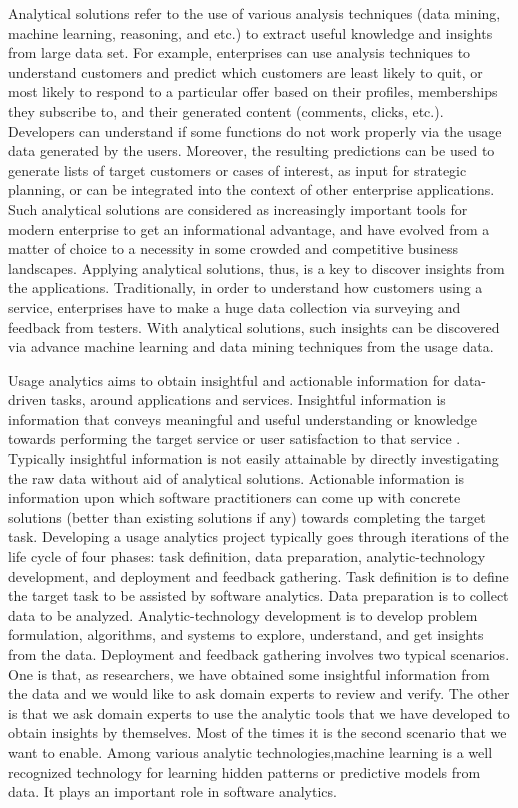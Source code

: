 Analytical solutions refer to the use of various analysis techniques (data mining, machine learning, reasoning, and etc.) to extract useful knowledge and insights from large data set. For example, enterprises can use analysis techniques to understand customers and predict which customers are least likely to quit, or most likely to respond to a particular offer based on their profiles, memberships they subscribe to, and their generated content (comments, clicks, etc.). Developers can understand if some functions do not work properly via the usage data generated by the users. Moreover, the resulting predictions can be used to generate lists of target customers or cases of interest, as input for strategic planning, or can be integrated into the context of other enterprise applications. Such analytical solutions are considered as increasingly important tools for modern enterprise to get an informational advantage, and have evolved from a matter of choice to a necessity in some crowded and competitive business landscapes. Applying analytical solutions, thus, is a key to discover insights from the applications. Traditionally, in order to understand how customers using a service, enterprises have to make a huge data collection via surveying and feedback from testers. With analytical solutions, such insights can be discovered via advance machine learning and data mining techniques from the usage data. 

Usage analytics aims to obtain insightful and actionable information for data-driven tasks, around applications and services. Insightful information is information that conveys meaningful and useful understanding or knowledge towards performing the target service or user satisfaction to that service \cite{Zhang2011}. Typically insightful information is not easily attainable by directly investigating the raw data without aid of analytical solutions. Actionable information is information upon which software practitioners can come up with concrete solutions (better than existing solutions if any) towards completing the target task. Developing a usage analytics project typically goes through iterations of the life cycle of four phases: task definition, data preparation, analytic-technology development, and deployment and feedback gathering. Task definition is to define the target task to be assisted by software analytics. Data preparation is to collect data to be analyzed. Analytic-technology development is to develop problem formulation, algorithms, and systems to explore, understand, and get insights from the data. Deployment and feedback gathering involves two typical scenarios. One is that, as researchers, we have obtained some insightful information from the data and we would like to ask domain experts to review and verify. The other is that we ask domain experts to use the analytic tools that we have developed to obtain insights by themselves. Most of the times it is the second scenario that we want to enable. Among various analytic technologies,machine learning is a well recognized technology for learning hidden patterns or predictive models from data. It plays an important role in software analytics. 

